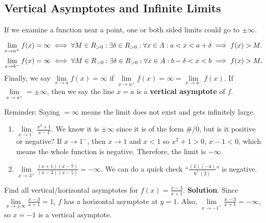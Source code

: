 \subsection{Vertical Asymptotes and Infinite Limits}
If we examine a function near a point, one or both sided limits could go to $ \pm\infty $.
\begin{Definition}{}{}
    \[ \lim\limits_{{x} \to {a^+}}f(x)=\infty\iff
        \forall M\in\relax{R}_{>0}:\exists \delta\in\relax{R}_{>0}:\forall x\in A: a<x<a+\delta\implies f(x)>M. \]
    \[ \lim\limits_{{x} \to {b^-}}f(x)=\infty\iff
        \forall M\in\relax{R}_{>0}:\exists \delta\in\relax{R}_{>0}:\forall x\in A: b-\delta<x<b\implies f(x)>M. \]
    Finally, we say $ \lim\limits_{{x} \to {a}}f(x)=\infty $ if
    $ \lim\limits_{{x} \to {a^+}}f(x)=\infty=\lim\limits_{{x} \to {a^-}}f(x) $.
    If $ \lim\limits_{{x} \to {a^\pm}}=\pm\infty $, then we say the line $ x=a $ is a \textbf{vertical asymptote} of $ f $.
\end{Definition}
\begin{Remark}{}{}
    Reminder: Saying $ =\infty $ means the limit does not exist and gets infinitely large.
\end{Remark}
\begin{Example}{}{}
    \begin{enumerate}[(1)]
        \item $ \displaystyle \lim\limits_{{x} \to {1^-}}\frac{x^2+1}{x-1} $. We know it is $ \pm\infty $ since it is of the form $ \#/0 $, but is it positive or negative?
              If $ x\to 1^- $, then $ x\to 1 $ and $ x<1 $ so $ x^2+1>0 $, $ x-1<0 $, which means the whole function is negative. Therefore,
              the limit is $ -\infty $.
        \item $ \displaystyle \lim\limits_{{x} \to {3^+}}\frac{(x+1)(x-7)}{(x-3)(x-1)}=-\infty $. We can do a quick check ``$ \frac{(4)(-4)}{0^+(2)} $'' is negative.
    \end{enumerate}
\end{Example}
\begin{Example}{}{}
    Find all vertical/horizontal asymptotes for $ f(x)=\frac{x-3}{x+1} $.
    \tcblower{}
    \textbf{Solution}. Since $ \lim\limits_{{x} \to {\pm\infty}}\frac{x-3}{x+1}=1 $, $ f $ has a horizontal asymptote at $ y=1 $. Also,
    $ \lim\limits_{{x} \to {-1^+}}\frac{x-3}{x+1}=-\infty $, so $ x=-1 $ is a vertical asymptote.
\end{Example}
